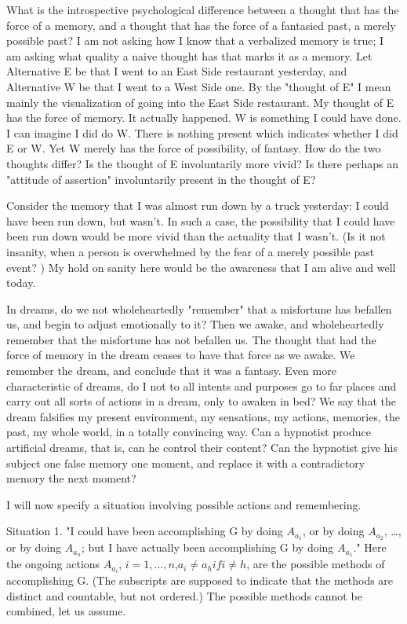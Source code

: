 What is the introspective psychological difference between a thought 
that has the force of a memory, and a thought that has the force of a 
fantasied past, a merely possible past? I am not asking how I know that a 
verbalized memory is true; I am asking what quality a naive thought has that 
marks it as a memory. Let Alternative E be that I went to an East Side 
restaurant yesterday, and Alternative W be that I went to a West Side one. 
By the "thought of E" I mean mainly the visualization of going into the East 
Side restaurant. My thought of E has the force of memory. It actually 
happened. W is something I could have done. I can imagine I did do W. There 
is nothing present which indicates whether I did E or W. Yet W merely has 
the force of possibility, of fantasy. How do the two thoughts differ? Is the 
thought of E involuntarily more vivid? Is there perhaps an "attitude of 
assertion" involuntarily present in the thought of E? 

Consider the memory that I was almost run down by a truck yesterday: 
I could have been run down, but wasn't. In such a case, the possibility that I 
could have been run down would be more vivid than the actuality that I 
wasn't. (Is it not insanity, when a person is overwhelmed by the fear of a 
merely possible past event? ) My hold on sanity here would be the awareness 
that I am alive and well today. 

In dreams, do we not wholeheartedly "remember" that a misfortune 
has befallen us, and begin to adjust emotionally to it? Then we awake, and 
wholeheartedly remember that the misfortune has not befallen us. The 
thought that had the force of memory in the dream ceases to have that force 
as we awake. We remember the dream, and conclude that it was a fantasy. 
Even more characteristic of dreams, do I not to all intents and purposes go 
to far places and carry out all sorts of actions in a dream, only to awaken in 
bed? We say that the dream falsifies my present environment, my 
sensations, my actions, memories, the past, my whole world, in a totally 
convincing way. Can a hypnotist produce artificial dreams, that is, can he 
control their content? Can the hypnotist give his subject one false memory 
one moment, and replace it with a contradictory memory the next 
moment? 

I will now specify a situation involving possible actions and 
remembering. 

Situation 1. "I could have been accomplishing G by doing $A_{a_1}$, or by 
doing $A_{a_2}$, \ldots, or by doing $A_{a_n}$; but I have actually been accomplishing G by 
doing $A_{a_1}$." Here the ongoing actions $A_{a_i}$, $i=1,...,n$,$a_i\neq a_h if i\neq h$, are 
the possible methods of accomplishing G. (The subscripts are supposed to 
indicate that the methods are distinct and countable, but not ordered.) The 
possible methods cannot be combined, let us assume. 

